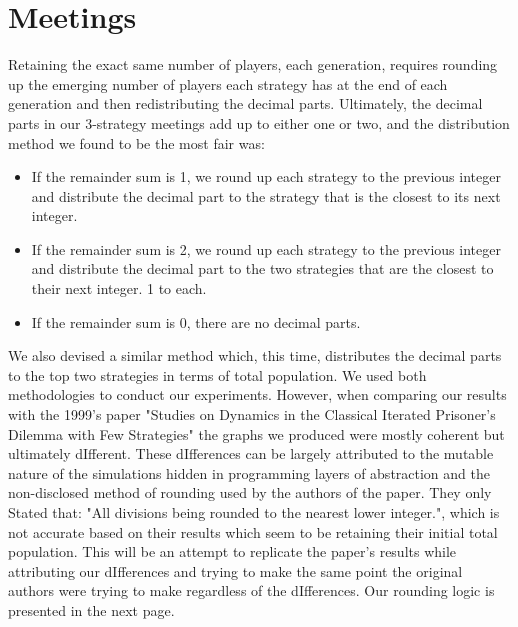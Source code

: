 \documentclass[12pt]{report}
\begin{document}
\section{Meetings}
Retaining the exact same number of players, each generation, requires rounding up the emerging number of players each strategy has at the end of each generation and then redistributing the decimal parts. Ultimately, the decimal parts in our 3-strategy meetings add up to either one or two, and the distribution method we found to be the most fair was:
\begin{itemize}
    \item If the remainder sum is 1, we round up each strategy to the previous integer and distribute the decimal part to the strategy that is the closest to its next integer.
    \item If the remainder sum is 2, we round up each strategy to the previous integer and distribute the decimal part to the two strategies that are the closest to their next integer. 1 to each.
    \item If the remainder sum is 0, there are no decimal parts.
\end{itemize}
We also devised a similar method which, this time, distributes the decimal parts to the top two strategies in terms of total population. We used both methodologies to conduct our experiments. However, when comparing our results with the 1999's paper "Studies on Dynamics in the Classical Iterated Prisoner's Dilemma with Few Strategies" the graphs we produced were mostly coherent but ultimately dIfferent. These dIfferences can be largely attributed to the mutable nature of the simulations hidden in programming layers of abstraction and the non-disclosed method of rounding used by the authors of the paper. They only Stated that: "All divisions being rounded to the nearest lower integer.", which is not accurate based on their results which seem to be retaining their initial total population. This will be an attempt to replicate the paper's results while attributing our dIfferences and trying to make the same point the original authors were trying to make regardless of the dIfferences. Our rounding logic is presented in the next page.
\end{document}
